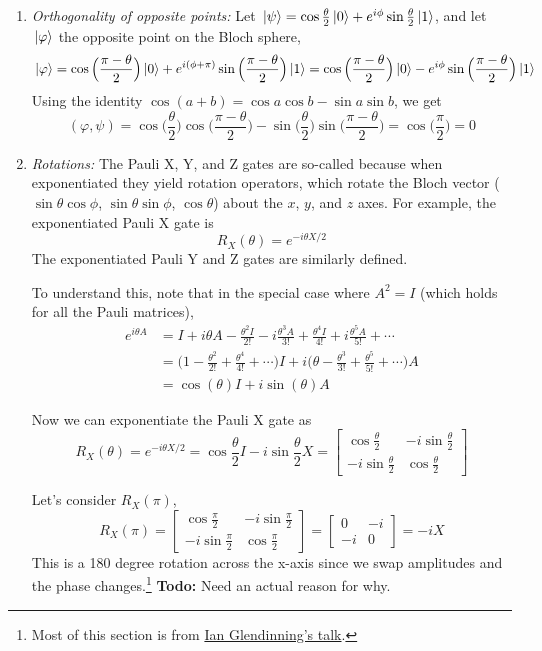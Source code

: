 \begin{enumerate}
	\item \textit{Orthogonality of opposite points:} Let $\ket*{\psi} = \cos \frac{\theta}{2} \ket*{0} + e^{i \phi} \sin \frac{\theta}{2} \ket*{1}$, and let $\ket*{\varphi}$ the opposite point on the Bloch sphere,
$$\ket*{\varphi} = \cos \Big( \frac{\pi - \theta}{2} \Big) \ket*{0} + e^{i(\phi + \pi)} \sin \Big( \frac{\pi - \theta}{2} \Big) \ket*{1} = \cos \Big( \frac{\pi - \theta}{2} \Big) \ket*{0} - e^{i \phi} \sin \Big( \frac{\pi - \theta}{2} \Big) \ket*{1}$$
Using the identity $\cos(a + b) = \cos a \cos b - \sin a \sin b$, we get
$$(\varphi, \psi) = \cos \Big( \frac{\theta}{2} \Big) \cos \Big( \frac{\pi - \theta}{2} \Big) - \sin \Big( \frac{\theta}{2} \Big) \sin \Big( \frac{\pi - \theta}{2} \Big) = \cos \Big( \frac{\pi}{2} \Big) = 0$$

	\item \textit{Rotations:} The Pauli X, Y, and Z gates are so-called because when exponentiated they yield rotation operators, which rotate the Bloch vector ($\sin \theta \cos \phi$, $\sin \theta \sin \phi$, $\cos \theta$) about the $x$, $y$, and $z$ axes. For example, the exponentiated Pauli X gate is
	$$R_{X} (\theta) = e^{-i\theta X / 2}$$
The exponentiated Pauli Y and Z gates are similarly defined. 

To understand this, note that in the special case where $A^{2} = I$ (which holds for all the Pauli matrices), 
$$
\begin{aligned}
e^{i \theta A} &= I + i\theta A - \frac{\theta^{2} I}{2!} - i \frac{\theta^{3} A}{3!} + \frac{\theta^{4} I}{4!} + i \frac{\theta^{5} A}{5!} + \cdots \\
&= \Big( 1 - \frac{\theta^{2}}{2!} + \frac{\theta^{4}}{4!} + \cdots \Big) I + i \Big( \theta - \frac{\theta^{3}}{3!} + \frac{\theta^{5}}{5!} + \cdots \Big) A \\
&= \cos (\theta) I + i \sin (\theta) A
\end{aligned}
$$

Now we can exponentiate the Pauli X gate as 
$$R_{X} (\theta) = e^{-i \theta X / 2} = \cos \frac{\theta}{2} I - i \sin \frac{\theta}{2} X = \begin{bmatrix}
\cos \frac{\theta}{2} & -i \sin \frac{\theta}{2} \\
-i \sin \frac{\theta}{2} & \cos \frac{\theta}{2}
\end{bmatrix}$$

Let's consider $R_{X}( \pi)$, 
$$R_{X} (\pi) = \begin{bmatrix}
\cos \frac{\pi}{2} & -i \sin \frac{\pi}{2} \\
-i \sin \frac{\pi}{2} & \cos \frac{\pi}{2}
\end{bmatrix} = \begin{bmatrix}
0 & -i \\
-i & 0
\end{bmatrix} = -iX$$
This is a 180 degree rotation across the x-axis since we swap amplitudes and the phase changes.\footnote{Most of this section is from \href{http://www.vcpc.univie.ac.at/~ian/hotlist/qc/talks/bloch-sphere.pdf}{Ian Glendinning's talk}.} \textbf{Todo:} Need an actual reason for why. 
\end{enumerate}

